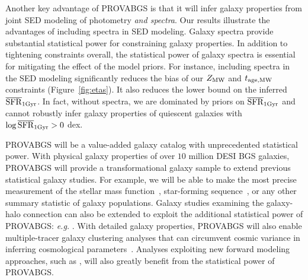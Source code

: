 Another key advantage of {\sc PROVABGS} is that it will infer galaxy
properties from joint SED modeling of photometry \emph{and spectra}. 
Our results illustrate the advantages of including spectra in SED modeling. 
Galaxy spectra provide substantial statistical power for constraining 
galaxy properties. 
In addition to tightening constraints overall, the statistical power of
galaxy spectra is essential for mitigating the effect of the model priors. 
For instance, including spectra in the SED modeling significantly reduces the
bias of our $Z_{\rm MW}$ and $t_{\rm age, MW}$ constraints (Figure~\ref{fig:etas}). 
It also reduces the lower bound on the inferred $\overline{\rm SFR}_{\rm 1Gyr}$. 
In fact, without spectra, we are dominated by priors on $\overline{\rm SFR}_{\rm 1Gyr}$ and cannot
robustly infer galaxy properties of quiescent galaxies with $\log\overline{\rm SFR}_{\rm 1Gyr} > 0$
dex.

{\sc PROVABGS} will be a value-added galaxy catalog with unprecedented
statistical power. 
With physical galaxy properties of over $10$ million DESI BGS galaxies, 
{\sc PROVABGS} will provide a transformational galaxy sample to extend
previous statistical galaxy studies. 
For example, we will be able to make the most precise measurement of the
stellar mass function~\citep[SMF]{li2009, moustakas2013}, star-forming
sequence~\citep{noeske2007}, or any other summary statistic of galaxy
populations. 
Galaxy studies examining the galaxy-halo connection can also be extended to
exploit the additional statistical power of {\sc PROVABGS}:
\emph{e.g.} \cite{tinker2011, wetzel2013, zu2015, hahn2017, hahn2019b}. 
With detailed galaxy properties, {\sc PROVABGS} will also enable
multiple-tracer galaxy clustering analyses that can circumvent cosmic variance
in inferring cosmological parameters~\citep{seljak2009, mcdonald2009,
wang2020}.
Analyses exploiting new forward modeling approaches, such as \cite{hahn2021},
will also greatly benefit from the statistical power of {\sc PROVABGS}.

